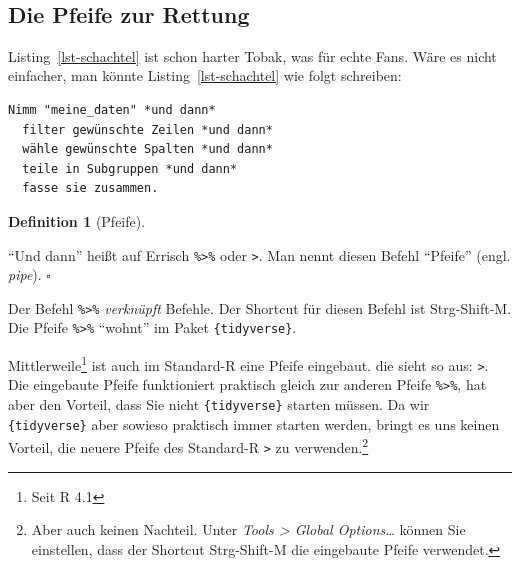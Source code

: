 \documentclass[
  a4paper,
  DIV=11]{scrreprt}
\theoremstyle{definition}
\theoremstyle{definition}
\theoremstyle{definition}
\newtheorem{definition}{Definition}[chapter]
\theoremstyle{remark}
\begin{document}
🤯

\subsection{Die Pfeife zur Rettung}\label{die-pfeife-zur-rettung}

Listing~\ref{lst-schachtel} ist schon harter Tobak, was für echte Fans.
Wäre es nicht einfacher, man könnte Listing~\ref{lst-schachtel} wie
folgt schreiben:

\begin{verbatim}
Nimm "meine_daten" *und dann*
  filter gewünschte Zeilen *und dann*
  wähle gewünschte Spalten *und dann*
  teile in Subgruppen *und dann*
  fasse sie zusammen.
\end{verbatim}

\begin{definition}[Pfeife]\protect\hypertarget{def-pipe}{}\label{def-pipe}

``Und dann'' heißt auf Errisch \texttt{\%\textgreater{}\%} oder
\texttt{\textbar{}\textgreater{}}. Man nennt diesen Befehl ``Pfeife''
(engl. \emph{pipe}). \(\square\)

\end{definition}

\begin{tcolorbox}[enhanced jigsaw, leftrule=.75mm, opacitybacktitle=0.6, colback=white, colframe=quarto-callout-note-color-frame, coltitle=black, colbacktitle=quarto-callout-note-color!10!white, opacityback=0, left=2mm, breakable, titlerule=0mm, toptitle=1mm, bottomtitle=1mm, rightrule=.15mm, title=\textcolor{quarto-callout-note-color}{\faInfo}\hspace{0.5em}{Hinweis}, arc=.35mm, bottomrule=.15mm, toprule=.15mm]

Der Befehl \texttt{\%\textgreater{}\%} \emph{verknüpft} Befehle. Der
Shortcut für diesen Befehl ist Strg-Shift-M. Die Pfeife
\texttt{\%\textgreater{}\%} ``wohnt'' im Paket
\texttt{\{tidyverse\}}.\footnotemark{}

\end{tcolorbox}


Mittlerweile\footnote{Seit R 4.1} ist auch im Standard-R eine Pfeife
eingebaut. die sieht so aus: \texttt{\textbar{}\textgreater{}}. Die
eingebaute Pfeife funktioniert praktisch gleich zur anderen Pfeife
\texttt{\%\textgreater{}\%}, hat aber den Vorteil, dass Sie nicht
\texttt{\{tidyverse\}} starten müssen. Da wir \texttt{\{tidyverse\}}
aber sowieso praktisch immer starten werden, bringt es uns keinen
Vorteil, die neuere Pfeife des Standard-R
\texttt{\textbar{}\textgreater{}} zu verwenden.\footnote{Aber auch
  keinen Nachteil. Unter \emph{Tools \textgreater{} Global
  Options\ldots{}} können Sie einstellen, dass der Shortcut Strg-Shift-M
  die eingebaute Pfeife verwendet.}
\end{document}
